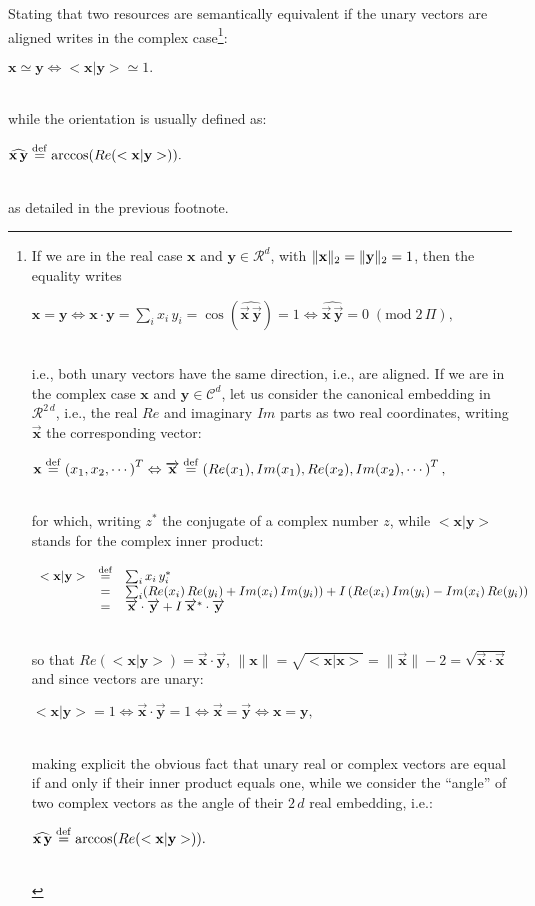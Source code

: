 \documentclass[sn-mathphys]{sn-jnl}
\newcommand{\defq}{\stackrel {\rm def}{=}}
\newcommand{\eqline}[1]{~\vspace{0.1cm}\\\centerline{$#1$}\vspace{0.1cm}\\}
\begin{document}
\begin{appendices}
Stating that two resources are semantically equivalent if the unary vectors are aligned writes in the complex case\footnote{If we are in the real case $\mathbf{x}$ and $\mathbf{y} \in {\mathcal R}^d$, with $\|{\bf x}\|_2 = \|{\bf y}\|_2 = 1$, then the equality writes
\eqline{\mathbf{x} = \mathbf{y} \Leftrightarrow \mathbf{x} \cdot \mathbf{y} = \sum_i x_i \, y_i = \cos\left(\widehat{\overrightarrow{\mathbf{x}} \, \overrightarrow{\mathbf{y}}}\right) = 1 \Leftrightarrow \widehat{\overrightarrow{\mathbf{x}} \, \overrightarrow{\mathbf{y}}} = 0 \; (\mbox{mod} \; 2 \, \Pi),}
i.e., both unary vectors have the same direction, i.e., are aligned.
If we are in the complex case $\mathbf{x}$ and $\mathbf{y} \in {\mathcal C}^d$, let us consider the canonical embedding in ${\mathcal R}^{2\,d}$, i.e., the real $Re$ and imaginary $Im$ parts as two real coordinates, writing $\overrightarrow{\mathbf{x}}$ the corresponding vector:
\eqline{\mathbf{x} \defq \left(x_1, x_2, \cdots \right)^T \Leftrightarrow \overrightarrow{\mathbf{x}} \defq \left(Re(x_1), Im(x_1), Re(x_2), Im(x_2), \cdots\right)^T,}
for which, writing $z^*$ the conjugate of a complex number $z$, while $<\mathbf{x} \vert \mathbf{y}>$ stands for the complex inner product:
\eqline{\begin{array}{rcl}<\mathbf{x} \vert \mathbf{y}> 
&\defq& \sum_i x_i \, y_i^* \\
&=& \sum_i 
  (Re(x_i) \, Re(y_i) + Im(x_i) \, Im(y_i)) + I \, (Re(x_i) \, Im(y_i) - Im(x_i) \, Re(y_i)) \\
&=&
  \overrightarrow{\mathbf{x}} \cdot \overrightarrow{\mathbf{y}} + I \, 
  \overrightarrow{\mathbf{x}}^* \cdot \overrightarrow{\mathbf{y}}
\end{array}}
so that $Re(<\mathbf{x} \vert \mathbf{y}>) = \overrightarrow{\mathbf{x}} \cdot \overrightarrow{\mathbf{y}}$, $\|\mathbf{x}\| = \sqrt{<\mathbf{x} \vert \mathbf{x}>} = \|\overrightarrow{\mathbf{x}}\|-2 = \sqrt{\overrightarrow{\mathbf{x}} \cdot \overrightarrow{\mathbf{x}}}$ and since vectors are unary: 
\eqline{<\mathbf{x} \vert \mathbf{y}> = 1 \Leftrightarrow \overrightarrow{\mathbf{x}} \cdot \overrightarrow{\mathbf{y}} = 1 \Leftrightarrow \overrightarrow{\mathbf{x}} = \overrightarrow{\mathbf{y}} \Leftrightarrow \mathbf{x} = \mathbf{y},}
making explicit the obvious fact that unary real or complex vectors are equal if and only if their inner product equals one, while we consider the ``angle'' of two complex vectors as the angle of their $2\,d$ real embedding, i.e.:
\eqline{\widehat{\mathbf{x} \, \mathbf{y}} \defq \mbox{arccos}(Re(<\mathbf{x} \vert \mathbf{y}>)).}}: 
\eqline{\mathbf{x} \simeq \mathbf{y} \Leftrightarrow <\mathbf{x} \vert \mathbf{y}> \simeq 1.
} while the orientation is usually defined as:
\eqline{\widehat{\mathbf{x} \, \mathbf{y}} \defq \mbox{arccos}(Re(<\mathbf{x} \vert \mathbf{y}>)).}
as detailed in the previous footnote.


\end{appendices}
\end{document}
